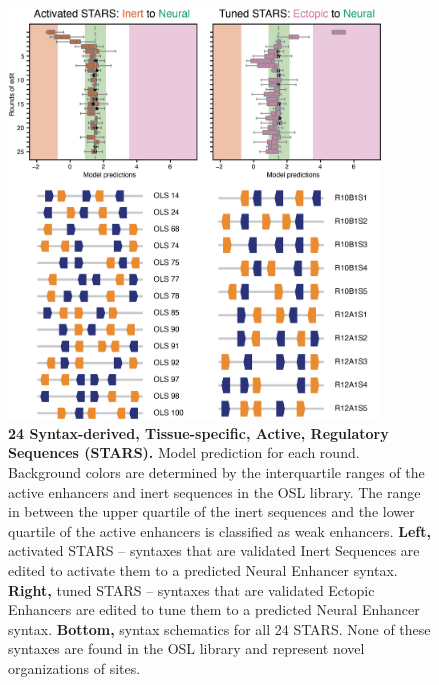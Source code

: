\begin{figure}[p]
    \centering
    \includegraphics[width=0.88\textwidth]{2_figures-and-files/SuppFig11.png}
    \caption[24 Syntax-derived, Tissue-specific, Active, Regulatory Sequences (STARS).]{\textbf{24 Syntax-derived, Tissue-specific, Active, Regulatory Sequences (STARS).} Model prediction for each round. Background colors are determined by the interquartile ranges of the active enhancers and inert sequences in the OSL library. The range in between the upper quartile of the inert sequences and the lower quartile of the active enhancers is classified as weak enhancers. \textbf{Left,} activated STARS – syntaxes that are validated Inert Sequences are edited to activate them to a predicted Neural Enhancer syntax. \textbf{Right,} tuned STARS – syntaxes that are validated Ectopic Enhancers are edited to tune them to a predicted Neural Enhancer syntax. \textbf{Bottom,} syntax schematics for all 24 STARS. None of these syntaxes are found in the OSL library and represent novel organizations of sites.}
    \label{fig:2 supplementary_11}
\end{figure}


